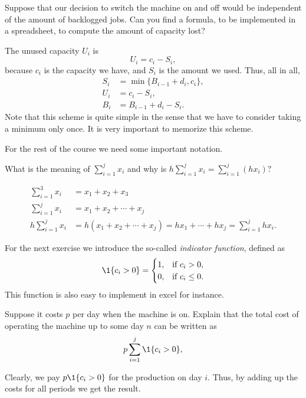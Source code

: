 \begin{exercise}
  Suppose that our decision to switch  the machine on and off would be independent
  of the amount of backlogged jobs. Can you find a formula, to be implemented in
  a spreadsheet, to compute the amount of capacity lost?
  \begin{solution}
The unused capacity $U_i$ is 
\begin{equation*}
  U_i = c_i - S_i,
\end{equation*}
because $c_i$ is the capacity we have, and $S_i$ is the amount we
used. Thus, all in all, 
\begin{align*}
      S_i &= \min\{B_{i-1}+d_i, c_i\}, \\
  U_i &= c_i - S_i, \\
  B_i &= B_{i-1}+d_i - S_i.
\end{align*}
Note that this scheme is quite simple in the sense that we have to
consider taking a minimum only once. It is very important to memorize this scheme.
  \end{solution}
\end{exercise}

For the rest of the course we need some important notation. 
\begin{exercise}
What is the meaning of $\sum_{i=1}^j x_i$ and why is $h \sum_{i=1}^j x_i = \sum_{i=1}^j (hx_i)?$
  \begin{solution}
    \begin{align*}
      \sum_{i=1}^3 x_i &= x_1 + x_2 + x_3 \\
      \sum_{i=1}^j x_i &= x_1 + x_2 + \cdots +x_j \\
     h \sum_{i=1}^j x_i &= h(x_1 + x_2 + \cdots +x_j) = hx_1 + \cdots+hx_j = \sum_{i=1}^j h x_i.
    \end{align*}
  \end{solution}
\end{exercise}

For the next exercise we introduce the so-called \emph{indicator
    function}, defined as
  \begin{equation*}
    \1{c_i>0} =
    \begin{cases}
      1, & \text{if } c_i > 0,\\
      0, & \text{if } c_i \leq 0.
    \end{cases}
  \end{equation*}
This function is also easy to implement in excel for instance. 


\begin{exercise}
Suppose it costs $p$ per day when  the machine is on. Explain that the total cost of operating the machine up to some day $n$ can be written as
    \begin{equation*}
      p \sum_{i=1}^j \1{c_i > 0},
    \end{equation*}
  \begin{solution}
Clearly,  we pay $p \1{c_i>0}$ for the production on day $i$. Thus, by adding up the costs for all periods we get the result.
  \end{solution}
\end{exercise}

